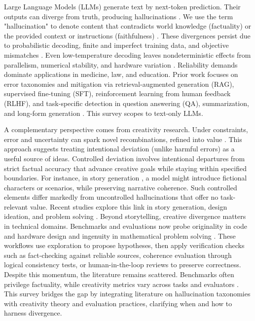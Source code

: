 \documentclass{llncs}
\begin{document}
Large Language Models (LLMs) generate text by next-token prediction. Their outputs can diverge from truth, producing hallucinations \cite{sahoo2024comprehensive,huang2025survey}. We use the term "hallucination" to denote content that contradicts world knowledge (factuality) or the provided context or instructions (faithfulness) \cite{ji2023hallucination,huang2025survey}. These divergences persist due to probabilistic decoding, finite and imperfect training data, and objective mismatches \cite{banerjee2024llms,kalai2025why}. Even low-temperature decoding leaves nondeterministic effects from parallelism, numerical stability, and hardware variation \cite{defeating2025nondeterminism}.
Reliability demands dominate applications in medicine, law, and education. Prior work focuses on error taxonomies and mitigation via retrieval-augmented generation (RAG), supervised fine-tuning (SFT), reinforcement learning from human feedback (RLHF), and task-specific detection in question answering (QA), summarization, and long-form generation \cite{huang2025survey,ji2023hallucination,zhang2023siren}. This survey scopes to text-only LLMs.

A complementary perspective comes from creativity research. Under constraints, error and uncertainty can spark novel recombinations, refined into value \cite{acar2019creativity}. This approach suggests treating intentional deviation (unlike harmful errors) as a useful source of ideas. Controlled deviation involves intentional departures from strict factual accuracy that advance creative goals while staying within specified boundaries. For instance, in story generation \cite{franceschelli2024creativity}, a model might introduce fictional characters or scenarios, while preserving narrative coherence. Such controlled elements differ markedly from uncontrolled hallucinations that offer no task-relevant value. 
Recent studies explore this link in story generation, design ideation, and problem solving \cite{sun2024hallucinating,he2025shakespearean,franceschelli2024creativity,rick2023supermind,tian2025macgyver}. Beyond storytelling, creative divergence matters in technical domains. Benchmarks and evaluations now probe originality in code and hardware design \cite{delorenzo2024creativeval,lu2025benchmarking} and ingenuity in mathematical problem solving \cite{ye2024assessing}. These workflows use exploration to propose hypotheses, then apply verification checks such as fact-checking against reliable sources, coherence evaluation through logical consistency tests, or human-in-the-loop reviews to preserve correctness.
Despite this momentum, the literature remains scattered. Benchmarks often privilege factuality, while creativity metrics vary across tasks and evaluators 
\cite{marco2025reader,cyriac2025metrics,li2025automated}. This survey bridges the gap by integrating literature on hallucination taxonomies with creativity theory and evaluation practices, clarifying when and how to harness divergence.
\end{document}
